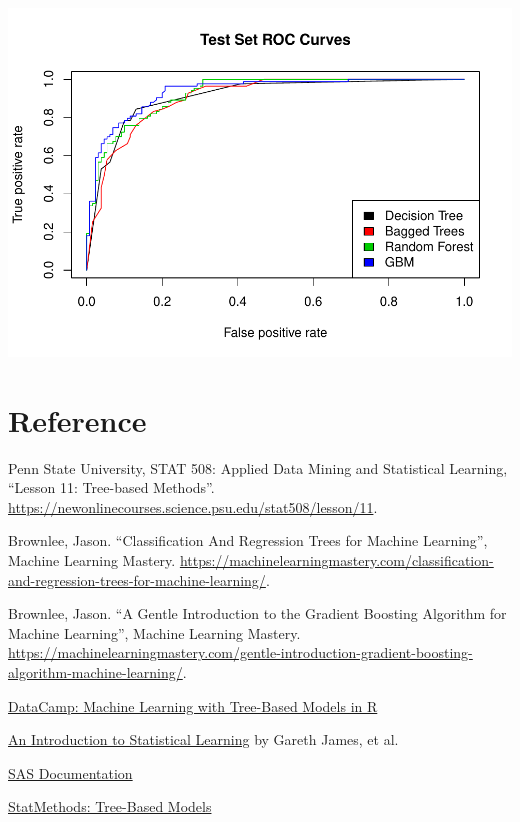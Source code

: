 \documentclass[
]{book}
\begin{document}
\includegraphics{data-sci_files/figure-latex/unnamed-chunk-124-1.pdf}

\hypertarget{reference}{%
\section{Reference}\label{reference}}

Penn State University, STAT 508: Applied Data Mining and Statistical Learning, ``Lesson 11: Tree-based Methods''. \url{https://newonlinecourses.science.psu.edu/stat508/lesson/11}.

Brownlee, Jason. ``Classification And Regression Trees for Machine Learning'', Machine Learning Mastery. \url{https://machinelearningmastery.com/classification-and-regression-trees-for-machine-learning/}.

Brownlee, Jason. ``A Gentle Introduction to the Gradient Boosting Algorithm for Machine Learning'', Machine Learning Mastery. \url{https://machinelearningmastery.com/gentle-introduction-gradient-boosting-algorithm-machine-learning/}.

\href{https://campus.datacamp.com/courses/machine-learning-with-tree-based-models-in-r}{DataCamp: Machine Learning with Tree-Based Models in R}

\href{http://faculty.marshall.usc.edu/gareth-james/ISL/}{An Introduction to Statistical Learning} by Gareth James, et al.

\href{http://support.sas.com/documentation/cdl/en/stathpug/68163/HTML/default/viewer.htm\#stathpug_hpsplit_details01.htm}{SAS Documentation}

\href{https://www.statmethods.net/advstats/cart.html}{StatMethods: Tree-Based Models}
\end{document}
